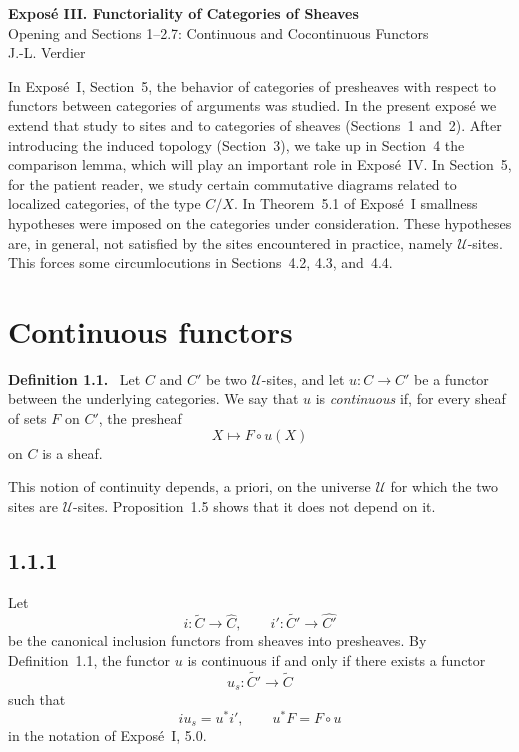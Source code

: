 \documentclass[11pt]{article}
\newcommand{\U}{\mathcal{U}}
\newenvironment{statement}[1]{\par\medskip\noindent\textbf{#1.}\ }{\par\medskip}
\begin{document}
\begin{center}
{\Large \textbf{Expos\'e III. Functoriality of Categories of Sheaves}}\\[0.35em]
{\large Opening and Sections 1--2.7: Continuous and Cocontinuous Functors}\\[0.35em]
J.-L. Verdier
\end{center}

\bigskip


\bigskip

In Expos\'e~I, Section~5, the behavior of categories of presheaves with respect to functors between categories of arguments was studied. In the present expos\'e we extend that study to sites and to categories of sheaves (Sections~1 and~2). After introducing the induced topology (Section~3), we take up in Section~4 the comparison lemma, which will play an important role in Expos\'e~IV. In Section~5, for the patient reader, we study certain commutative diagrams related to localized categories, of the type \(C/X\). In Theorem~5.1 of Expos\'e~I smallness hypotheses were imposed on the categories under consideration. These hypotheses are, in general, not satisfied by the sites encountered in practice, namely \(\U\)-sites. This forces some circumlocutions in Sections~4.2, 4.3, and~4.4.

\section{Continuous functors}

\begin{statement}{Definition 1.1}
Let \(C\) and \(C'\) be two \(\U\)-sites, and let
\(u:C\to C'\) be a functor between the underlying categories. We say that \(u\) is \emph{continuous} if, for every sheaf of sets \(F\) on \(C'\), the presheaf
\[
X\longmapsto F\circ u(X)
\]
on \(C\) is a sheaf.
\end{statement}

This notion of continuity depends, a priori, on the universe \(\U\) for which the two sites are \(\U\)-sites. Proposition~1.5 shows that it does not depend on it.

\subsection*{1.1.1}
Let
\[
i:\widetilde C\longrightarrow \widehat C,
\qquad
 i':\widetilde {C'}\longrightarrow \widehat {C'}
\]
be the canonical inclusion functors from sheaves into presheaves. By Definition~1.1, the functor \(u\) is continuous if and only if there exists a functor
\[
u_s:\widetilde {C'}\longrightarrow \widetilde C
\]
such that
\[
 i u_s=u^* i',\qquad u^*F=F\circ u
\]
in the notation of Expos\'e~I, 5.0.
\end{document}

